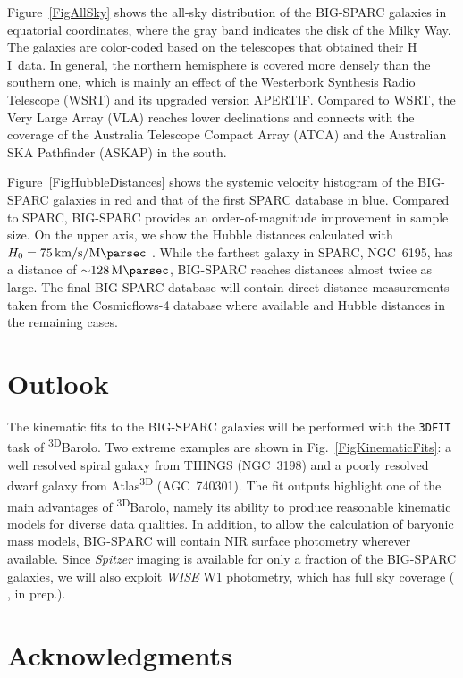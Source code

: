 \documentclass{iau}
\newcommand{\hi}{{\rm H}\,{\small\rm I}}
\begin{document}
Figure~\ref{FigAllSky} shows the all-sky distribution of the BIG-SPARC galaxies in equatorial coordinates, where the gray band indicates the disk of the Milky Way. The galaxies are color-coded based on the telescopes that obtained their \hi\ data. In general, the northern hemisphere is covered more densely than the southern one, which is mainly an effect of the Westerbork Synthesis Radio Telescope (WSRT) and its upgraded version APERTIF. Compared to WSRT, the Very Large Array (VLA) reaches lower declinations and connects with the coverage of the Australia Telescope Compact Array (ATCA) and the Australian SKA Pathfinder (ASKAP) in the south.

Figure~\ref{FigHubbleDistances} shows the systemic velocity histogram of the BIG-SPARC galaxies in red and that of the first SPARC database in blue. Compared to SPARC, BIG-SPARC provides an order-of-magnitude improvement in sample size. On the upper axis, we show the Hubble distances calculated with $H_0 = \SI{75}{\kilo\meter\per\second\per\mega\parsec}$ \citep{Tully2016}. While the farthest galaxy in SPARC, NGC~6195, has a distance of ${\sim}\SI{128}{\mega\parsec}$, BIG-SPARC reaches distances almost twice as large. The final BIG-SPARC database will contain direct distance measurements taken from the Cosmicflows-4 database \citep{Tully2023} where available and Hubble distances in the remaining cases.

\section{Outlook}

The kinematic fits to the BIG-SPARC galaxies will be performed with the \texttt{3DFIT} task of \textsuperscript{3D}Barolo. Two extreme examples are shown in Fig.~\ref{FigKinematicFits}: a well resolved spiral galaxy from THINGS (NGC~3198) and a poorly resolved dwarf galaxy from Atlas\textsuperscript{3D} (AGC~740301). The fit outputs highlight one of the main advantages of \textsuperscript{3D}Barolo, namely its ability to produce reasonable kinematic models for diverse data qualities. In addition, to allow the calculation of baryonic mass models, BIG-SPARC will contain NIR surface photometry wherever available. Since \textit{Spitzer} imaging is available for only a fraction of the BIG-SPARC galaxies, we will also exploit \textit{WISE} W1 photometry, which has full sky coverage (\citeauthor{Duey2024} \citeyear{Duey2024}, in prep.).

\small
\section*{Acknowledgments}
\end{document}
